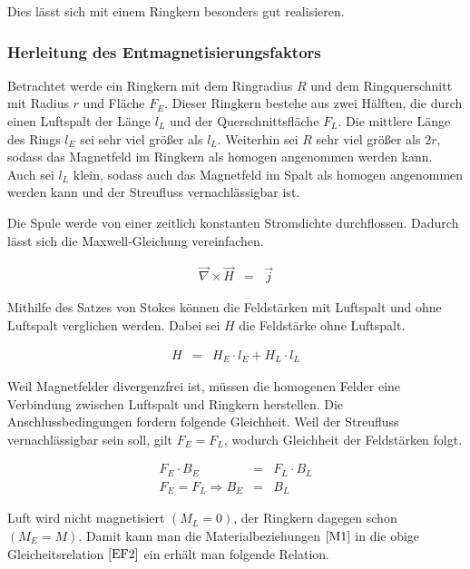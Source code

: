 \documentclass[12pt,a4paper]{scrartcl}
\numberwithin{equation}{section} %
\renewcommand{\[}{} %
\renewcommand{\]}{\noindent} %
\begin{document}
Dies lässt sich mit einem Ringkern besonders gut realisieren.

\hypertarget{herleitung-des-entmagnetisierungsfaktors}{%
\subsubsection{Herleitung des
Entmagnetisierungsfaktors}\label{herleitung-des-entmagnetisierungsfaktors}}

Betrachtet werde ein Ringkern mit dem Ringradius \(R\) und dem
Ringquerschnitt mit Radius \(r\) und Fläche \(F_E\). Dieser Ringkern
bestehe aus zwei Hälften, die durch einen Luftspalt der Länge \(l_L\)
und der Querschnittsfläche \(F_L\). Die mittlere Länge des Rings \(l_E\)
sei sehr viel größer als \(l_L\). Weiterhin sei \(R\) sehr viel größer
als \(2r\), sodass das Magnetfeld im Ringkern als homogen angenommen
werden kann. Auch sei \(l_L\) klein, sodass auch das Magnetfeld im Spalt
als homogen angenommen werden kann und der Streufluss vernachlässigbar
ist.

Die Spule werde von einer zeitlich konstanten Stromdichte durchflossen.
Dadurch lässt sich die Maxwell-Gleichung vereinfachen.

\[
\begin{eqnarray}
    \vec \nabla \times \vec H &=& \vec j
\end{eqnarray}
\]

Mithilfe des Satzes von Stokes können die Feldstärken mit Luftspalt und
ohne Luftspalt verglichen werden. Dabei sei \(H\) die Feldstärke ohne
Luftspalt.

\[
\begin{eqnarray}
    H &=& H_E\cdot l_E + H_L \cdot l_L \label{EF1}
\end{eqnarray}
\]

Weil Magnetfelder divergenzfrei ist, müssen die homogenen Felder eine
Verbindung zwischen Luftspalt und Ringkern herstellen. Die
Anschlussbedingungen fordern folgende Gleichheit. Weil der Streufluss
vernachlässigbar sein soll, gilt \(F_E = F_L\), wodurch Gleichheit der
Feldstärken folgt.

\[
\begin{eqnarray}
    F_E\cdot B_E &=& F_L\cdot B_L \nonumber \\
    F_E = F_L \Rightarrow B_E &=& B_L \label{EF2}
\end{eqnarray}
\]

Luft wird nicht magnetisiert \((M_L=0)\), der Ringkern dagegen schon
\((M_E=M)\). Damit kann man die Materialbeziehungen \(\eqref{M1}\) in
die obige Gleicheitsrelation \(\eqref{EF2}\) ein erhält man folgende
Relation.
\end{document}
